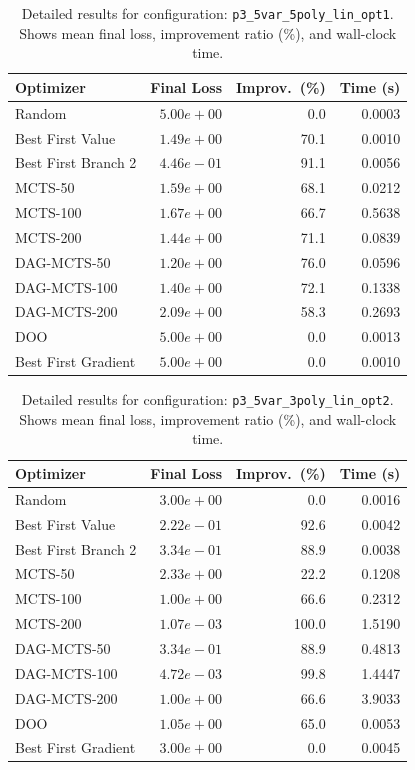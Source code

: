 \begin{table}[H]
\centering
\caption{Detailed results for configuration: \texttt{p3\_5var\_5poly\_lin\_opt1}. Shows mean final loss, improvement ratio (\%), and wall-clock time.}
\label{tab:abssum-detail-22}
\begin{tabular}{lrrr}
\toprule
Optimizer & Final Loss & Improv.~(\%) & Time (s) \\
\midrule
Random & $5.00e+00$ & 0.0 & 0.0003 \\
\hline
Best First Value & $1.49e+00$ & 70.1 & 0.0010 \\
\hline
Best First Branch 2 & \textbf{$4.46e-01$} & 91.1 & 0.0056 \\
\hline
MCTS-50 & $1.59e+00$ & 68.1 & 0.0212 \\
\hline
MCTS-100 & $1.67e+00$ & 66.7 & 0.5638 \\
\hline
MCTS-200 & $1.44e+00$ & 71.1 & 0.0839 \\
\hline
DAG-MCTS-50 & $1.20e+00$ & 76.0 & 0.0596 \\
\hline
DAG-MCTS-100 & $1.40e+00$ & 72.1 & 0.1338 \\
\hline
DAG-MCTS-200 & $2.09e+00$ & 58.3 & 0.2693 \\
\hline
DOO & $5.00e+00$ & 0.0 & 0.0013 \\
\hline
Best First Gradient & $5.00e+00$ & 0.0 & 0.0010 \\
\bottomrule
\end{tabular}
\end{table}

\begin{table}[H]
\centering
\caption{Detailed results for configuration: \texttt{p3\_5var\_3poly\_lin\_opt2}. Shows mean final loss, improvement ratio (\%), and wall-clock time.}
\label{tab:abssum-detail-23}
\begin{tabular}{lrrr}
\toprule
Optimizer & Final Loss & Improv.~(\%) & Time (s) \\
\midrule
Random & $3.00e+00$ & 0.0 & 0.0016 \\
\hline
Best First Value & $2.22e-01$ & 92.6 & 0.0042 \\
\hline
Best First Branch 2 & $3.34e-01$ & 88.9 & 0.0038 \\
\hline
MCTS-50 & $2.33e+00$ & 22.2 & 0.1208 \\
\hline
MCTS-100 & $1.00e+00$ & 66.6 & 0.2312 \\
\hline
MCTS-200 & \textbf{$1.07e-03$} & 100.0 & 1.5190 \\
\hline
DAG-MCTS-50 & $3.34e-01$ & 88.9 & 0.4813 \\
\hline
DAG-MCTS-100 & $4.72e-03$ & 99.8 & 1.4447 \\
\hline
DAG-MCTS-200 & $1.00e+00$ & 66.6 & 3.9033 \\
\hline
DOO & $1.05e+00$ & 65.0 & 0.0053 \\
\hline
Best First Gradient & $3.00e+00$ & 0.0 & 0.0045 \\
\bottomrule
\end{tabular}
\end{table}

